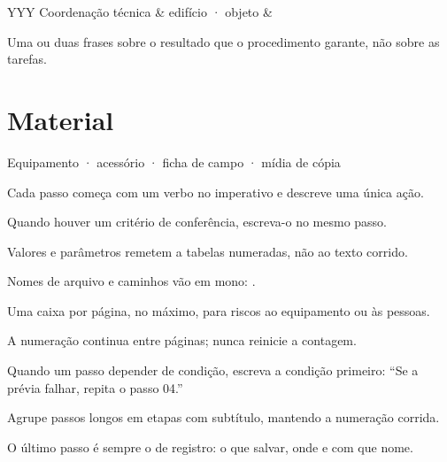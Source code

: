 \documentclass[pop]{lina}
\begin{document}
\begin{metadados}{YYY}
  \newline Coordenação técnica &
  \newline edifício · objeto &
  \newline {}
\end{metadados}

Uma ou duas frases sobre o resultado que o procedimento garante, não sobre as tarefas.

\section{Material}
Equipamento · acessório · ficha de campo · mídia de cópia

\begin{passos}
  \item Cada passo começa com um verbo no imperativo e descreve uma única ação.
  \item Quando houver um critério de conferência, escreva-o no mesmo passo.
  \item Valores e parâmetros remetem a tabelas numeradas, não ao texto corrido.
  \item Nomes de arquivo e caminhos vão em mono: .
\end{passos}

\begin{atencao}
   Uma caixa por página, no máximo, para riscos ao equipamento ou às pessoas.
\end{atencao}

\paginademo

\begin{passos}
  \item A numeração continua entre páginas; nunca reinicie a contagem.
  \item Quando um passo depender de condição, escreva a condição primeiro: “Se a prévia falhar, repita o passo 04.”
  \item Agrupe passos longos em etapas com subtítulo, mantendo a numeração corrida.
  \item O último passo é sempre o de registro: o que salvar, onde e com que nome.
\end{passos}
\end{document}
